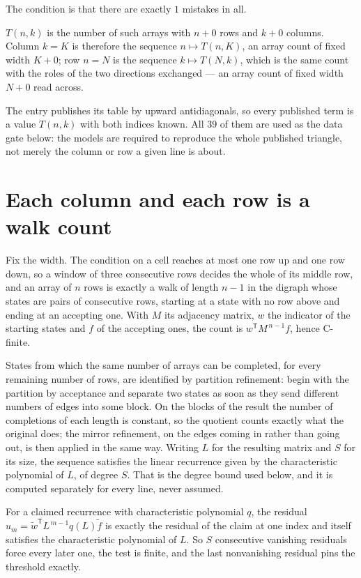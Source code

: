 \documentclass[11pt]{article}
\theoremstyle{definition}
\begin{document}
The condition is that there are exactly $1$ mistakes in all.

$T(n,k)$ is the number of such arrays with $n + 0$ rows and $k + 0$ columns. Column $k = K$ is therefore the sequence $n \mapsto T(n,K)$, an array count of fixed width $K + 0$; row $n = N$ is the sequence $k \mapsto T(N,k)$, which is the same count with the roles of the two directions exchanged --- an array count of fixed width $N + 0$ read across.

The entry publishes its table by upward antidiagonals, so every published term is a value $T(n,k)$ with both indices known. All 39 of them are used as the data gate below: the models are required to reproduce the whole published triangle, not merely the column or row a given line is about.

\section{Each column and each row is a walk count}

Fix the width. The condition on a cell reaches at most one row up and one row down, so a window of three consecutive rows decides the whole of its middle row, and an array of $n$ rows is exactly a walk of length $n-1$ in the digraph whose states are pairs of consecutive rows, starting at a state with no row above and ending at an accepting one. With $M$ its adjacency matrix, $w$ the indicator of the starting states and $f$ of the accepting ones, the count is $w^{\mathsf T}M^{\,n-1}f$, hence C-finite.

States from which the same number of arrays can be completed, for every remaining number of rows, are identified by partition refinement: begin with the partition by acceptance and separate two states as soon as they send different numbers of edges into some block. On the blocks of the result the number of completions of each length is constant, so the quotient counts exactly what the original does; the mirror refinement, on the edges coming in rather than going out, is then applied in the same way. Writing $L$ for the resulting matrix and $S$ for its size, the sequence satisfies the linear recurrence given by the characteristic polynomial of $L$, of degree $S$. That is the degree bound used below, and it is computed separately for every line, never assumed.

For a claimed recurrence with characteristic polynomial $q$, the residual $u_m = \tilde w^{\mathsf T}L^{\,m-1}q(L)\tilde f$ is exactly the residual of the claim at one index and itself satisfies the characteristic polynomial of $L$. So $S$ consecutive vanishing residuals force every later one, the test is finite, and the last nonvanishing residual pins the threshold exactly.
\end{document}
